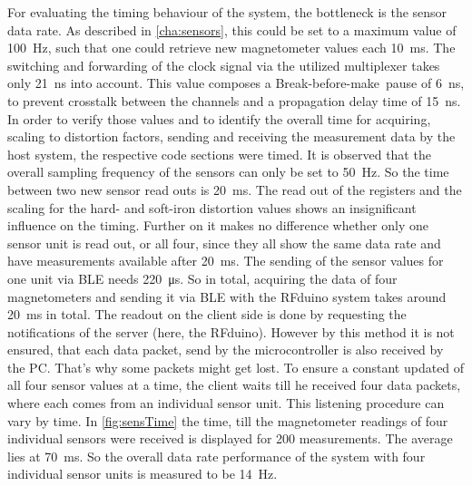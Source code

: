 For evaluating the timing behaviour of the system, the bottleneck is the sensor data rate. As described in \ref{cha:sensors}, this could be set to a maximum value of \SI{100}{\Hz}, such that one could retrieve new magnetometer values each \SI{10}{\milli \second}. The switching and forwarding of the clock signal via the utilized multiplexer takes only \SI{21}{\nano \second} into account. This value composes a \grqq Break-before-make\grqq \, pause of \SI{6}{\nano \second}, to prevent crosstalk between the channels and a propagation delay time of \SI{15}{\nano \second}. In order to verify those values and to identify the overall time for acquiring, scaling to distortion factors, sending and receiving the measurement data by the host system, the respective code sections were timed. It is observed that the overall sampling frequency of the sensors can only be set to \SI{50}{\Hz}. So the time between two new sensor read outs is \SI{20}{\milli \second}. The read out of the registers and the scaling for the hard- and soft-iron distortion values shows an insignificant influence on the timing. Further on it makes no difference whether only one sensor unit is read out, or all four, since they all show the same data rate and have measurements available after \SI{20}{\milli \second}. The sending of the sensor values for one unit via BLE needs \SI{220}{\micro \second}. So in total, acquiring the data of four magnetometers and sending it via BLE with the RFduino system takes around \SI{20}{\milli \second} in total. The readout on the client side is done by requesting the notifications of the server (here, the RFduino). However by this method it is not ensured, that each data packet, send by the microcontroller is also received by the PC. That's why some packets might get lost. To ensure a constant updated of all four sensor values at a time, the client waits till he received four data packets, where each comes from an individual sensor unit. This listening procedure can vary by time. In \ref{fig:sensTime} the time, till the magnetometer readings of four individual sensors were received is displayed for 200 measurements. The average lies at \SI{70}{\milli \second}. So the overall data rate performance of the system with four individual sensor units is measured to be \SI{14}{\Hz}.



